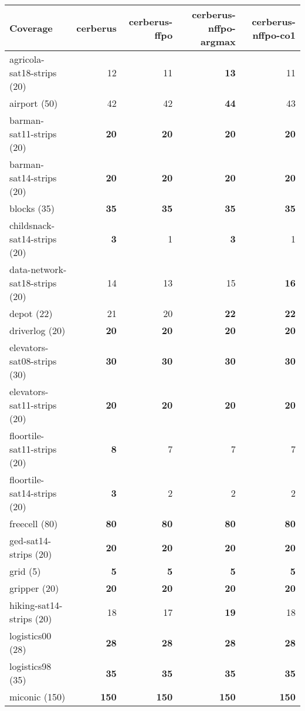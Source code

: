 \documentclass{article}
\newcommand{\numtasks}[1]{\small{(#1)}}
\begin{document}
\begin{tabular}{@{}lrrrr@{}}
Coverage & cerberus & cerberus-ffpo & cerberus-nffpo-argmax & cerberus-nffpo-co1 \\
\midrule
agricola-sat18-strips \numtasks{20} & 12 & 11 & \textbf{13} & 11 \\
airport \numtasks{50} & 42 & 42 & \textbf{44} & 43 \\
barman-sat11-strips \numtasks{20} & \textbf{20} & \textbf{20} & \textbf{20} & \textbf{20} \\
barman-sat14-strips \numtasks{20} & \textbf{20} & \textbf{20} & \textbf{20} & \textbf{20} \\
blocks \numtasks{35} & \textbf{35} & \textbf{35} & \textbf{35} & \textbf{35} \\
childsnack-sat14-strips \numtasks{20} & \textbf{3} & 1 & \textbf{3} & 1 \\
data-network-sat18-strips \numtasks{20} & 14 & 13 & 15 & \textbf{16} \\
depot \numtasks{22} & 21 & 20 & \textbf{22} & \textbf{22} \\
driverlog \numtasks{20} & \textbf{20} & \textbf{20} & \textbf{20} & \textbf{20} \\
elevators-sat08-strips \numtasks{30} & \textbf{30} & \textbf{30} & \textbf{30} & \textbf{30} \\
elevators-sat11-strips \numtasks{20} & \textbf{20} & \textbf{20} & \textbf{20} & \textbf{20} \\
floortile-sat11-strips \numtasks{20} & \textbf{8} & 7 & 7 & 7 \\
floortile-sat14-strips \numtasks{20} & \textbf{3} & 2 & 2 & 2 \\
freecell \numtasks{80} & \textbf{80} & \textbf{80} & \textbf{80} & \textbf{80} \\
ged-sat14-strips \numtasks{20} & \textbf{20} & \textbf{20} & \textbf{20} & \textbf{20} \\
grid \numtasks{5} & \textbf{5} & \textbf{5} & \textbf{5} & \textbf{5} \\
gripper \numtasks{20} & \textbf{20} & \textbf{20} & \textbf{20} & \textbf{20} \\
hiking-sat14-strips \numtasks{20} & 18 & 17 & \textbf{19} & 18 \\
logistics00 \numtasks{28} & \textbf{28} & \textbf{28} & \textbf{28} & \textbf{28} \\
logistics98 \numtasks{35} & \textbf{35} & \textbf{35} & \textbf{35} & \textbf{35} \\
miconic \numtasks{150} & \textbf{150} & \textbf{150} & \textbf{150} & \textbf{150} \\

\end{tabular}
\end{document}
